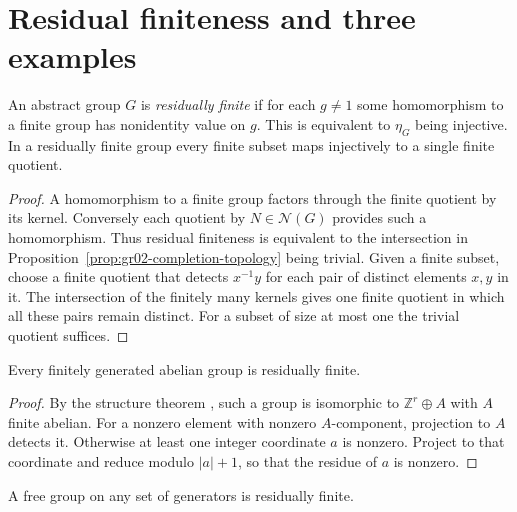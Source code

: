 \section{Residual finiteness and three examples}

\begin{proposition}
\label{prop:gr02-residual-finiteness}
An abstract group \(G\) is \emph{residually finite} if for each
\(g\ne 1\) some homomorphism to a finite group has nonidentity
value on \(g\). This is equivalent to \(\eta_G\) being injective.
In a residually finite group every finite subset maps injectively
to a single finite quotient.
\end{proposition}

\begin{proof}
A homomorphism to a finite group factors through the finite quotient
by its kernel. Conversely each quotient by \(N\in\mathcal N(G)\)
provides such a homomorphism. Thus residual finiteness is equivalent
to the intersection in Proposition~\ref{prop:gr02-completion-topology}
being trivial. Given a finite subset, choose a finite quotient
that detects \(x^{-1}y\) for each pair of distinct elements \(x,y\)
in it. The intersection of the finitely many kernels gives one
finite quotient in which all these pairs remain distinct.
For a subset of size at most one the trivial quotient suffices.
\end{proof}

\begin{proposition}
\label{prop:gr02-abelian-residual}
Every finitely generated abelian group is residually finite.
\end{proposition}

\begin{proof}
By the structure theorem \cite[K07.07.fg\_abelian\_extension]{d07},
such a group is isomorphic to \(\mathbb Z^r\oplus A\) with \(A\)
finite abelian. For a nonzero element with nonzero \(A\)-component,
projection to \(A\) detects it. Otherwise at least one integer
coordinate \(a\) is nonzero. Project to that coordinate and reduce
modulo \(|a|+1\), so that the residue of \(a\) is nonzero.
\end{proof}

\begin{theorem}
\label{thm:gr02-free-residual}
A free group on any set of generators is residually finite.
\end{theorem}

